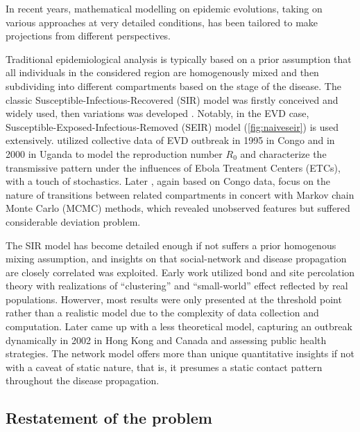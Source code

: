 In recent years, mathematical modelling on epidemic evolutions, 
 taking on various approaches at very detailed conditions, has been 
tailored to make projections from different perspectives.\par
 Traditional epidemiological analysis is typically based on 
 a prior assumption that all individuals in the considered region
are homogenously mixed and then subdividing into different
 compartments based on the stage of the disease. 
 The classic Susceptible-Infectious-Recovered (SIR) model 
 was firstly conceived and widely used, then variations was developed
 \cite{kerm27}\cite{legr07}. Notably, in the EVD case, 
 Susceptible-Exposed-Infectious-Removed (SEIR) model 
 (\autoref{fig:naiveseir}) is used extensively.
 \cite{chow04} utilized collective data of EVD 
 outbreak in 1995 in Congo and in 2000 in Uganda to model the 
 reproduction number $R_0$ and characterize the transmissive pattern 
 under the influences of Ebola Treatment Centers (ETCs), 
 with a touch of stochastics. Later \cite{leko06}, 
 again based on Congo data, focus on the nature of transitions between 
 related compartments in concert with Markov chain Monte Carlo 
 (MCMC) methods, which revealed unobserved features but suffered 
 considerable deviation problem.\par
 
 The SIR model has become detailed enough if not suffers a prior 
 homogenous mixing assumption, and insights on that social-network
 and disease propagation are closely correlated was exploited\cite{newm99}.
 Early work utilized bond and site percolation theory with 
 realizations of ``clustering'' and ``small-world'' effect reflected by 
 real populations\cite{moor00}. Howerver, most results were only 
 presented at the threshold point rather than a realistic model 
 due to the complexity of data collection and computation. Later 
 \cite{meye05} came up with a less theoretical model, capturing an 
 outbreak dynamically in 2002 in Hong Kong and Canada and 
 assessing public health strategies. 
 The network model offers more than unique quantitative insights if
not with a caveat of static nature, that is, it presumes a static
contact pattern throughout the disease propagation. \par
 
\subsection{Restatement of the problem}



